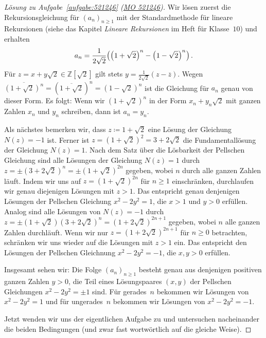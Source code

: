 \begin{proof}[Lösung zu Aufgabe~\ref{aufgabe:521246} \textmd{(\href{https://www.mathematik-olympiaden.de/moev/index.php?option=com_download&thema=a&datei=A52124b.pdf&format=raw}{MO 521246})}]
	Wir lösen zuerst die Rekursionsgleichung für $(a_n)_{n\geqslant 1}$ mit der Standardmethode für lineare Rekursionen (siehe das Kapitel \emph{Lineare Rekursionen} im Heft für Klasse~$10$) und erhalten
	\begin{equation*}
		a_n=\frac{1}{2\sqrt{2}}\parens*{\parens*{1+\sqrt{2}}^n-\parens*{1-\sqrt{2}}^n}\,.
	\end{equation*}
	Für $z=x+y\sqrt{2}\in \mathbb Z[\sqrt{2}]$ gilt stets $y=\frac{1}{2\sqrt{2}}(z-\overline{z})$. Wegen $\overline{(1+\sqrt{2})^n}=(\overline{1+\sqrt{2}})^n=(1-\sqrt{2})^n$ ist die Gleichung für $a_n$ genau von dieser Form. Es folgt: Wenn wir $(1+\sqrt{2})^n$ in der Form $x_n+y_n\sqrt{2}$ mit ganzen Zahlen $x_n$ und $y_n$ schreiben, dann ist $a_n=y_n$.
	
	Als nächstes bemerken wir, dass $z\coloneqq 1+\sqrt{2}$ eine Lösung der Gleichung $N(z)=-1$ ist. Ferner ist $z=(1+\sqrt{2})^2=3+2\sqrt{2}$ die Fundamentallösung der Gleichung $N(z)=1$. Nach dem Satz über die Lösbarkeit der Pellschen Gleichung sind alle Lösungen der Gleichung $N(z)=1$ durch $z=\pm (3+2\sqrt{2})^n=\pm (1+\sqrt{2})^{2n}$ gegeben, wobei $n$ durch alle ganzen Zahlen läuft. Indem wir uns auf $z=(1+\sqrt{2})^{2n}$ für $n\geqslant 1$ einschränken, durchlaufen wir genau diejenigen Lösungen mit $z>1$. Das entspricht genau denjenigen Lösungen der Pellschen Gleichung $x^2-2y^2=1$, die $x>1$ und $y>0$ erfüllen. Analog sind alle Lösungen von $N(z)=-1$ durch $z=\pm (1+\sqrt{2})(3+2\sqrt{2})^n=(1+2\sqrt{2})^{2n+1}$ gegeben, wobei $n$ alle ganzen Zahlen durchläuft. Wenn wir nur $z=(1+2\sqrt{2})^{2n+1}$ für $n\geqslant 0$ betrachten, schränken wir uns wieder auf die Lösungen mit $z>1$ ein. Das entspricht den Lösungen der Pellschen Gleichnung $x^2-2y^2=-1$, die $x,y>0$ erfüllen.
	
	Insgesamt sehen wir: Die Folge $(a_n)_{n\geqslant 1}$ besteht genau aus denjenigen positiven ganzen Zahlen $y>0$, die Teil eines Lösungspaares $(x,y)$ der Pellschen Gleichungen $x^2-2y^2=\pm 1$ sind. Für gerades~$n$ bekommen wir Lösungen von $x^2-2y^2=1$ und für ungerades~$n$ bekommen wir Lösungen von $x^2-2y^2=-1$.
	
	Jetzt wenden wir uns der eigentlichen Aufgabe zu und untersuchen nacheinander die beiden Bedingungen (und zwar fast wortwörtlich auf die gleiche Weise).
	

\end{proof}
